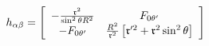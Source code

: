 \begin{equation*}
h_{\alpha \beta }=\left[
\begin{array}{cc}
-\frac{\frak{r}^{2}}{\sin ^{2}\theta R^{2}} & F_{0\theta ^{\prime }} \\
-F_{0\theta ^{\prime }} & \frac{R^{2}}{\frak{r}^{2}}\left[ \frak{r}^{\prime
2}+\frak{r}^{2}\sin ^{2}\theta \right]
\end{array}
\right]
\end{equation*}

